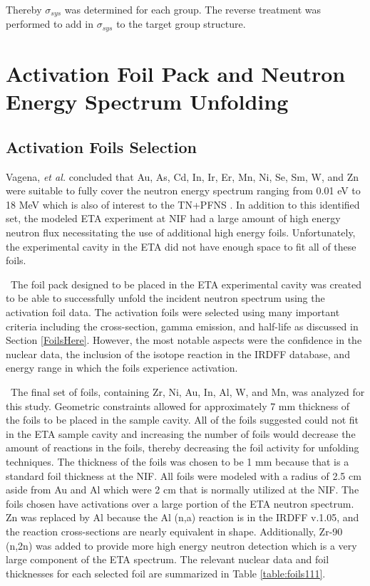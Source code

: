 \noindent Thereby $\sigma_{sys}$ was determined for each group. 
The reverse treatment was performed to add in $\sigma_{sys}$ to the target group structure. 

\section{Activation Foil Pack and Neutron Energy Spectrum Unfolding}

\subsection{Activation Foils Selection}

Vagena, \textit{et al.} concluded that Au, As, Cd, In, Ir, Er, Mn, Ni, Se, Sm, W, and Zn were suitable to fully cover the neutron energy spectrum ranging from 0.01 eV to 18 MeV which is also of interest to the TN+PFNS \cite{Vagena2018b}.
In addition to this identified set, the modeled ETA experiment at NIF had a large amount of high energy neutron flux necessitating the use of additional high energy foils.  
Unfortunately, the experimental cavity in the ETA did not have enough space to fit all of these foils.

\ The foil pack designed to be placed in the ETA experimental cavity was created to be able to successfully unfold the incident neutron spectrum using the activation foil data. 
The activation foils were selected using many important criteria including the cross-section, gamma emission, and half-life as discussed in Section \ref{FoilsHere}.
However, the most notable aspects were the confidence in the nuclear data, the inclusion of the isotope reaction in the IRDFF database, and energy range in which the foils experience activation.   

\ The final set of foils, containing Zr, Ni, Au, In, Al, W, and Mn, was analyzed for this study. 
Geometric constraints allowed for approximately 7 mm thickness of the foils to be placed in the sample cavity.
All of the foils suggested could not fit in the ETA sample cavity and increasing the number of foils would decrease the amount of reactions in the foils, thereby decreasing the foil activity for unfolding techniques.  
The thickness of the foils was chosen to be 1 mm because that is a standard foil thickness at the NIF.
All foils were modeled with a radius of 2.5 cm aside from Au and Al which were 2 cm that is normally utilized at the NIF.
The foils chosen have activations over a large portion of the ETA neutron spectrum. 
Zn was replaced by Al because the Al (n,a) reaction is in the IRDFF v.1.05, and the reaction cross-sections are nearly equivalent in shape.
Additionally, Zr-90 (n,2n) was added to provide more high energy neutron detection which is a very large component of the ETA spectrum. 
The relevant nuclear data and foil thicknesses for each selected foil are summarized in Table \ref{table:foils111}. 

